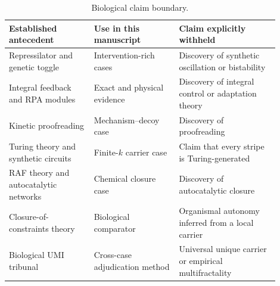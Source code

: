 \begin{table}[htbp]
\centering
\small
\caption{Biological claim boundary.}
\label{tab:bio-claim-boundary}
\begin{tabular}{p{0.29\linewidth}p{0.28\linewidth}p{0.33\linewidth}}
\toprule
Established antecedent & Use in this manuscript & Claim explicitly withheld \\
\midrule
Repressilator and genetic toggle & Intervention-rich cases & Discovery of synthetic oscillation or bistability \\
Integral feedback and RPA modules & Exact and physical evidence & Discovery of integral control or adaptation theory \\
Kinetic proofreading & Mechanism--decoy case & Discovery of proofreading \\
Turing theory and synthetic circuits & Finite-$k$ carrier case & Claim that every stripe is Turing-generated \\
RAF theory and autocatalytic networks & Chemical closure case & Discovery of autocatalytic closure \\
Closure-of-constraints theory & Biological comparator & Organismal autonomy inferred from a local carrier \\
Biological UMI tribunal & Cross-case adjudication method & Universal unique carrier or empirical multifractality \\
\bottomrule
\end{tabular}
\end{table}
